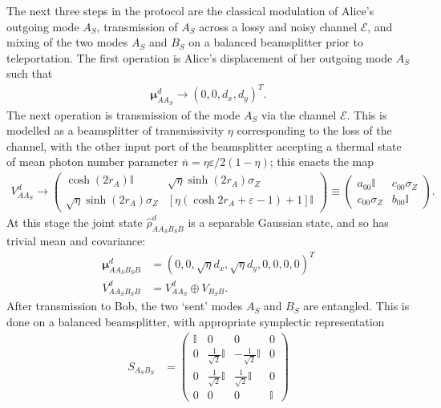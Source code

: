 \documentclass[%
 reprint,
 superscriptaddress,
 amsmath,
 amssymb,
 aps,
 pra,
]{revtex4-2}
\newcommand{\id}{\mathbb{I}}
\newcommand{\sz}{\sigma_Z}
\newcommand{\e}{\varepsilon}
\begin{document}
\begin{widetext}
The next three steps in the protocol are the classical modulation of Alice's outgoing mode $A_S$, transmission of $A_S$ across a lossy and noisy channel $\mathcal{E}$, and mixing of the two modes $A_S$ and $B_S$ on a balanced beamsplitter prior to teleportation. The first operation is Alice's displacement of her outgoing mode $A_S$ such that
\begin{align}
    \bm{\mu}_{AA_S}^d \longrightarrow (0, 0, d_x, d_y)^T.
\end{align}
The next operation is transmission of the mode $A_S$ via the channel $\mathcal{E}$. This is modelled as a beamsplitter of transmissivity $\eta$ corresponding to the loss of the channel, with the other input port of the beamsplitter accepting a thermal state of mean photon number parameter $\overline{n} = \eta \e / 2(1-\eta)$; this enacts the map
\begin{align}
    V_{AA_S}^d \rightarrow \begin{pmatrix}
        \cosh(2r_A) \id & \sqrt{\eta}\sinh(2r_A) \sz \\
        \sqrt{\eta} \sinh(2r_A) \sz & \left[ \eta(\cosh 2r_A + \e - 1) + 1 \right] \id
    \end{pmatrix} \equiv \begin{pmatrix}
        a_{00} \id & c_{00} \sz \\
        c_{00} \sz & b_{00} \id
    \end{pmatrix}.
\end{align}
At this stage the joint state $\hat \rho_{AA_SB_SB}^d$ is a separable Gaussian state, and so has trivial mean and covariance:
\begin{align}
    \bm{\mu}_{AA_SB_SB}^d &= (0,0,\sqrt{\eta} d_x,\sqrt{\eta} d_y,0,0,0,0)^T \\
    V_{AA_SB_SB}^d &= V_{AA_S}^d \oplus V_{B_SB}.
\end{align}
After transmission to Bob, the two `sent' modes $A_S$ and $B_S$ are entangled. This is done on a balanced beamsplitter, with appropriate symplectic representation
\begin{align}
    S_{A_SB_S} &= \begin{pmatrix}
        \id & 0 & 0 & 0 \\
        0 & \frac{1}{\sqrt{2}} \id & -\frac{1}{\sqrt{2}} \id & 0 \\
        0 & \frac{1}{\sqrt{2}} \id & \frac{1}{\sqrt{2}} \id & 0 \\
        0 & 0 & 0 & \id
    \end{pmatrix}
\end{align}

\end{widetext}
\end{document}
